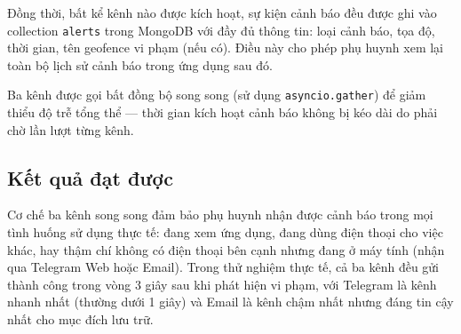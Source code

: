 \documentclass[../DoAn.tex]{subfiles}
\begin{document}
Đồng thời, bất kể kênh nào được kích hoạt, sự kiện cảnh báo đều được ghi vào collection \texttt{alerts} trong MongoDB với đầy đủ thông tin: loại cảnh báo, tọa độ, thời gian, tên geofence vi phạm (nếu có). Điều này cho phép phụ huynh xem lại toàn bộ lịch sử cảnh báo trong ứng dụng sau đó.

Ba kênh được gọi bất đồng bộ song song (sử dụng \texttt{asyncio.gather}) để giảm thiểu độ trễ tổng thể — thời gian kích hoạt cảnh báo không bị kéo dài do phải chờ lần lượt từng kênh.

\subsection{Kết quả đạt được}

Cơ chế ba kênh song song đảm bảo phụ huynh nhận được cảnh báo trong mọi tình huống sử dụng thực tế: đang xem ứng dụng, đang dùng điện thoại cho việc khác, hay thậm chí không có điện thoại bên cạnh nhưng đang ở máy tính (nhận qua Telegram Web hoặc Email). Trong thử nghiệm thực tế, cả ba kênh đều gửi thành công trong vòng 3 giây sau khi phát hiện vi phạm, với Telegram là kênh nhanh nhất (thường dưới 1 giây) và Email là kênh chậm nhất nhưng đáng tin cậy nhất cho mục đích lưu trữ.
\end{document}
